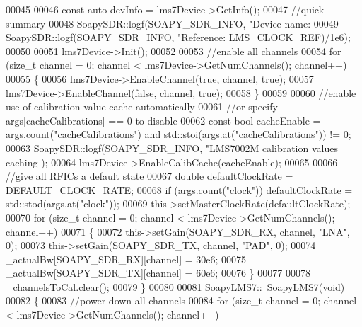\begin{DoxyCode}
{00045     
00046     \textcolor{keyword}{const} \textcolor{keyword}{auto} devInfo = lms7Device->GetInfo();  
00047     \textcolor{comment}{//quick summary}
00048     SoapySDR::logf(SOAPY\_SDR\_INFO, \textcolor{stringliteral}{"Device name: %
00049     SoapySDR::logf(SOAPY\_SDR\_INFO, \textcolor{stringliteral}{"Reference: %
      LMS_CLOCK_REF)/1e6);
00050 
00051     lms7Device->Init();
00052 
00053     \textcolor{comment}{//enable all channels}
00054     \textcolor{keywordflow}{for} (\textcolor{keywordtype}{size\_t} channel = 0; channel < lms7Device->GetNumChannels(); channel++)
00055     \{
00056         lms7Device->EnableChannel(\textcolor{keyword}{true}, channel, \textcolor{keyword}{true});   
00057         lms7Device->EnableChannel(\textcolor{keyword}{false}, channel, \textcolor{keyword}{true});
00058     \}
00059 
00060     \textcolor{comment}{//enable use of calibration value cache automatically}
00061     \textcolor{comment}{//or specify args[cacheCalibrations] == 0 to disable}
00062     \textcolor{keyword}{const} \textcolor{keywordtype}{bool} cacheEnable = args.count(\textcolor{stringliteral}{"cacheCalibrations"}) and std::stoi(args.at(\textcolor{stringliteral}{"cacheCalibrations"})) !=
       0;
00063     SoapySDR::logf(SOAPY\_SDR\_INFO, \textcolor{stringliteral}{"LMS7002M calibration values caching %
      );
00064     lms7Device->EnableCalibCache(cacheEnable);
00065 
00066     \textcolor{comment}{//give all RFICs a default state}
00067     \textcolor{keywordtype}{double} defaultClockRate = DEFAULT_CLOCK_RATE;
00068     \textcolor{keywordflow}{if} (args.count(\textcolor{stringliteral}{"clock"})) defaultClockRate = std::stod(args.at(\textcolor{stringliteral}{"clock"}));
00069     this->setMasterClockRate(defaultClockRate);
00070     \textcolor{keywordflow}{for} (\textcolor{keywordtype}{size\_t} channel = 0; channel < lms7Device->GetNumChannels(); channel++)
00071     \{
00072         this->setGain(SOAPY\_SDR\_RX, channel, \textcolor{stringliteral}{"LNA"}, 0);
00073         this->setGain(SOAPY\_SDR\_TX, channel, \textcolor{stringliteral}{"PAD"}, 0);
00074         _actualBw[SOAPY\_SDR\_RX][channel] = 30e6;
00075         _actualBw[SOAPY\_SDR\_TX][channel] = 60e6;
00076     \}
00077 
00078     _channelsToCal.clear();
00079 \}
00080 
00081 SoapyLMS7::~SoapyLMS7(\textcolor{keywordtype}{void})
00082 \{
00083     \textcolor{comment}{//power down all channels}
00084     \textcolor{keywordflow}{for} (\textcolor{keywordtype}{size\_t} channel = 0; channel < lms7Device->GetNumChannels(); channel++)
}}}}
\end{DoxyCode}
